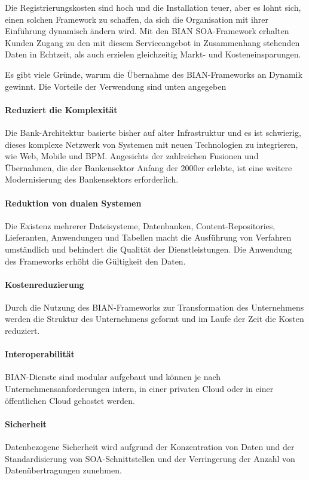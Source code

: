 \documentclass[
	doc,
	a4paper,
	helv
	]{apa6}
\begin{document}
Die Registrierungskosten sind hoch und die Installation teuer, aber es lohnt sich, einen solchen Framework zu schaffen, da sich die Organisation mit ihrer Einführung dynamisch ändern wird. Mit den BIAN SOA-Framework erhalten Kunden Zugang zu den mit diesem Serviceangebot in Zusammenhang stehenden Daten in Echtzeit, als auch erzielen  gleichzeitig Markt- und Kosteneinsparungen.

Es gibt viele Gründe, warum die Übernahme des BIAN-Frameworks an Dynamik gewinnt. Die Vorteile der Verwendung sind unten angegeben
\paragraph{Reduziert die Komplexität}
Die Bank-Architektur basierte bisher auf alter Infrastruktur und es ist schwierig, dieses komplexe Netzwerk von Systemen mit neuen Technologien zu integrieren, wie Web, Mobile und BPM. Angesichts der zahlreichen Fusionen und Übernahmen, die der Bankensektor Anfang der 2000er erlebte, ist eine weitere Modernisierung des Bankensektors erforderlich.
\paragraph{Reduktion von dualen Systemen}
Die Existenz mehrerer Dateisysteme, Datenbanken, Content-Repositories, Lieferanten, Anwendungen und Tabellen macht die Ausführung von Verfahren umständlich und behindert die Qualität der Dienstleistungen. Die Anwendung des Frameworks erhöht die Gültigkeit den Daten.
\paragraph{Kostenreduzierung}
Durch die Nutzung des BIAN-Frameworks zur Transformation des Unternehmens werden die Struktur des Unternehmens geformt und im Laufe der Zeit die Kosten reduziert.
\paragraph{Interoperabilität}	
BIAN-Dienste sind modular aufgebaut und können je nach Unternehmensanforderungen intern, in einer privaten Cloud oder in einer öffentlichen Cloud gehostet werden.
\paragraph{Sicherheit}
Datenbezogene Sicherheit wird aufgrund der Konzentration von Daten und der Standardisierung von SOA-Schnittstellen und der Verringerung der Anzahl von Datenübertragungen zunehmen.
\end{document}
